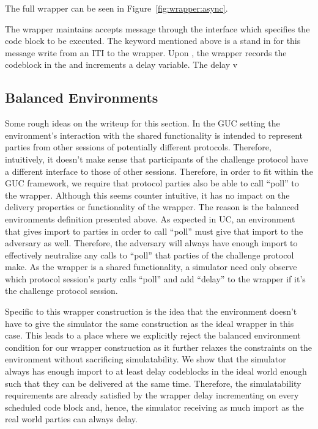 The full wrapper can be seen in Figure~\ref{fig:wrapper:async}.

The wrapper maintains accepts message through the  interface which specifies the code block to be executed.
The \Eventually keyword mentioned above is a stand in for this message write from an ITI to the wrapper.
Upon , the wrapper records the codeblock in the  and increments a delay variable.
The delay v


\subsection{Balanced Environments}
Some rough ideas on the writeup for this section.
In the GUC setting the environment’s interaction with the shared functionality is intended to represent parties from other sessions of potentially different protocols. 
Therefore, intuitively, it doesn’t make sense that participants of the challenge protocol have a different interface to those of other sessions. 
Therefore, in order to fit within the GUC framework, we require that protocol parties also be able to call “poll” to the wrapper. 
Although this seems counter intuitive, it has no impact on the delivery properties or functionality of the wrapper. 
The reason is the balanced environments definition presented above. 
As expected in UC, an environment that gives import to parties in order to call “poll” must give that import to the adversary as well. 
Therefore, the adversary will always have enough import to effectively neutralize any calls to “poll” that parties of the challenge protocol make. 
As the wrapper is a shared functionality, a simulator need only observe which protocol session’s party calls “poll” and add “delay” to the wrapper if it’s the challenge protocol session.  

Specific to this wrapper construction is the idea that the environment doesn’t have to give the simulator the same construction as the ideal wrapper in this case. 
This leads to a place where we explicitly reject the balanced environment condition for our wrapper construction as it further relaxes the constraints on the environment without sacrificing simulatability. 
We show that the simulator always has enough import to at least delay codeblocks in the ideal world enough such that they can be delivered at the same time. 
Therefore, the simulatability requirements are already satisfied by the wrapper delay incrementing on every scheduled code block and, hence, the simulator receiving as much import as the real world parties can always delay.

